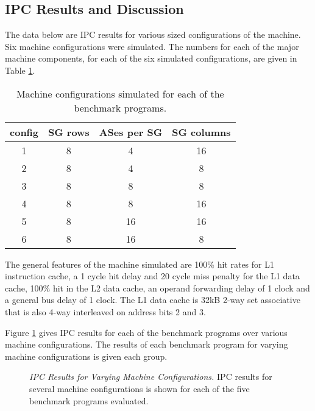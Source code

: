 \documentclass[10pt,dvips]{article}
\begin{document}
\subsection{IPC Results and Discussion}
%
The data below are IPC results for various sized configurations of
the machine.  Six machine configurations were simulated.
The numbers for each of the major machine components, for each of the six
simulated configurations, are given in Table \ref{tab:configs}.

\begin{table}
\begin{center}
\caption{Machine configurations simulated for each of the benchmark
programs.}
\label{tab:configs}
\begin{tabular}{|c|c|c|c|}
\hline 
config&
SG rows&
ASes per SG&
SG columns\\
\hline
\hline 
1&
8&
4&
16\\
\hline 
2&
8&
4&
8\\
\hline 
3&
8&
8&
8\\
\hline 
4&
8&
8&
16\\
\hline 
5&
8&
16&
16\\
\hline 
6&
8&
16&
8\\
\hline
\end{tabular}
\end{center}
\end{table}

The general features of
the machine simulated are 100\% hit rates for L1 instruction cache,
a 1 cycle hit delay and 20 cycle miss penalty for the L1 data cache,
100\% hit in the L2 data cache, an operand forwarding delay of 1 clock
and a general bus delay of 1 clock.  The L1 data cache is 32kB 2-way
set associative that is also 4-way interleaved on address bits 2 and 3.

Figure \ref{fig:ipc} gives IPC results for each of the benchmark
programs over various machine configurations.
The results of each benchmark program for varying machine
configurations is given each group.  

\begin{figure}
\vspace{0.2 in}
\setlength{\epsfxsize}{10cm}%
\centerline{}
\caption{{\em IPC Results for Varying Machine Configurations.} 
IPC results for several machine configurations is shown for each of
the five benchmark programs evaluated.}
\label{fig:ipc}
\end{figure}
\end{document}
